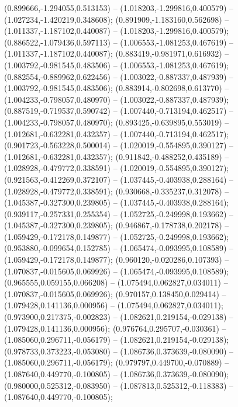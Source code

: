  (0.899666,-1.294055,0.513153) -- (1.018203,-1.299816,0.400579) -- (1.027234,-1.420219,0.348608);
 (0.891909,-1.183160,0.562698) -- (1.011337,-1.187102,0.440087) -- (1.018203,-1.299816,0.400579);
 (0.886522,-1.079436,0.597113) -- (1.006553,-1.081253,0.467619) -- (1.011337,-1.187102,0.440087);
 (0.883419,-0.981971,0.616932) -- (1.003792,-0.981545,0.483506) -- (1.006553,-1.081253,0.467619);
 (0.882554,-0.889962,0.622456) -- (1.003022,-0.887337,0.487939) -- (1.003792,-0.981545,0.483506);
 (0.883914,-0.802698,0.613770) -- (1.004233,-0.798057,0.480970) -- (1.003022,-0.887337,0.487939);
 (0.887519,-0.719537,0.590742) -- (1.007440,-0.713194,0.462517) -- (1.004233,-0.798057,0.480970);
 (0.893425,-0.639895,0.553019) -- (1.012681,-0.632281,0.432357) -- (1.007440,-0.713194,0.462517);
 (0.901723,-0.563228,0.500014) -- (1.020019,-0.554895,0.390127) -- (1.012681,-0.632281,0.432357);
 (0.911842,-0.488252,0.435189) -- (1.028928,-0.479772,0.338591) -- (1.020019,-0.554895,0.390127);
 (0.921563,-0.412269,0.372107) -- (1.037445,-0.403938,0.288164) -- (1.028928,-0.479772,0.338591);
 (0.930668,-0.335237,0.312078) -- (1.045387,-0.327300,0.239805) -- (1.037445,-0.403938,0.288164);
 (0.939117,-0.257331,0.255354) -- (1.052725,-0.249998,0.193662) -- (1.045387,-0.327300,0.239805);
 (0.946867,-0.178738,0.202178) -- (1.059429,-0.172178,0.149877) -- (1.052725,-0.249998,0.193662);
 (0.953880,-0.099654,0.152785) -- (1.065474,-0.093995,0.108589) -- (1.059429,-0.172178,0.149877);
 (0.960120,-0.020286,0.107393) -- (1.070837,-0.015605,0.069926) -- (1.065474,-0.093995,0.108589);
 (0.965555,0.059155,0.066208) -- (1.075494,0.062827,0.034011) -- (1.070837,-0.015605,0.069926);
 (0.970157,0.138450,0.029414) -- (1.079428,0.141136,0.000956) -- (1.075494,0.062827,0.034011);
 (0.973900,0.217375,-0.002823) -- (1.082621,0.219154,-0.029138) -- (1.079428,0.141136,0.000956);
 (0.976764,0.295707,-0.030361) -- (1.085060,0.296711,-0.056179) -- (1.082621,0.219154,-0.029138);
 (0.978733,0.373223,-0.053080) -- (1.086736,0.373639,-0.080090) -- (1.085060,0.296711,-0.056179);
 (0.979797,0.449700,-0.070889) -- (1.087640,0.449770,-0.100805) -- (1.086736,0.373639,-0.080090);
 (0.980000,0.525312,-0.083950) -- (1.087813,0.525312,-0.118383) -- (1.087640,0.449770,-0.100805);
